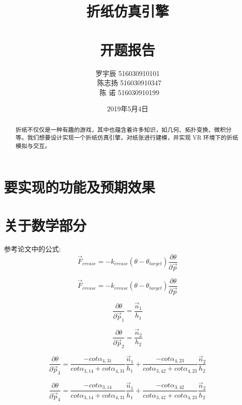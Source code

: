 \documentclass{ctexart}
\title{折纸仿真引擎\\\ \\ 开题报告}
\author{
罗宇辰 516030910101  \\\
陈志扬 516030910347  \\\
陈  诺 516030910199
}
\date{2019年5月4日}
\begin{document}
\maketitle
\tableofcontents


\begin{abstract}
折纸不仅仅是一种有趣的游戏，其中也蕴含着许多知识，如几何、拓扑变换、微积分等。我们想要设计实现一个折纸仿真引擎，对纸张进行建模，并实现 VR 环境下的折纸模拟与交互。
\end{abstract}

\section{要实现的功能及预期效果}


\section{关于数学部分}
参考论文\cite{ref1}中的公式:
\begin{equation}
    \vec F_{crease} = - k_{crease} (\theta - \theta_{target}) \frac {\partial \theta}{\partial \vec p}
\end{equation}

\begin{equation}
\vec F_{crease} = - k_{crease} (\theta - \theta_{target}) \frac {\partial \theta}{\partial \vec p}
\end{equation}

\begin{equation}
\frac{\partial \theta}{\partial \vec p_1} = \frac{\vec n_1}{h_1}
\end{equation}

\begin{equation}
\frac{\partial \theta}{\partial \vec p_2} = \frac{\vec n_2}{h_2}
\end{equation}

\begin{equation}
\frac{\partial \theta}{\partial \vec p_3} = \frac{-cot \alpha_{4,31}}{cot \alpha_{3,14}+cot \alpha_{4,31}}\frac{\vec n_1}{h_1} + \frac{-cot \alpha_{4,23}}{cot \alpha_{3,42}+cot \alpha_{4,23}}\frac{\vec n_2}{h_2}
\end{equation}

\begin{equation}
\frac{\partial \theta}{\partial \vec p_4} = \frac{-cot \alpha_{3,14}}{cot \alpha_{3,14}+cot \alpha_{4,31}}\frac{\vec n_1}{h_1} + \frac{-cot \alpha_{3,42}}{cot \alpha_{3,42}+cot \alpha_{4,23}}\frac{\vec n_2}{h_2}
\end{equation}
\end{document}
